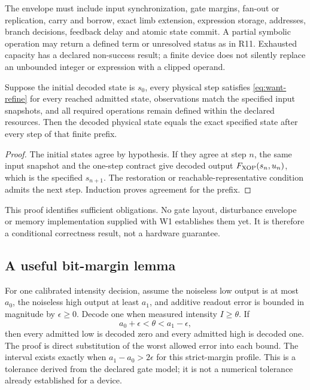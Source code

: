 The envelope must include input synchronization, gate margins, fan-out or
replication, carry and borrow, exact limb extension, expression storage,
addresses, branch decisions, feedback delay and atomic state commit. A partial
symbolic operation may return a defined term or unresolved status as in R11.
Exhausted capacity has a declared non-success result; a finite device does not
silently replace an unbounded integer or expression with a clipped operand.

\begin{proposition}
Suppose the initial decoded state is $s_0$, every physical step satisfies
\eqref{eq:want-refine} for every reached admitted state, observations match the
specified input snapshots, and all required operations remain defined within
the declared resources. Then the decoded physical state equals the exact
specified state after every step of that finite prefix.
\end{proposition}
\begin{proof}
The initial states agree by hypothesis. If they agree at step $n$, the same
input snapshot and the one-step contract give decoded output $F_{\rm XOP}(s_n,u_n)$,
which is the specified $s_{n+1}$. The restoration or reachable-representative
condition admits the next step. Induction proves agreement for the prefix.
\end{proof}
This proof identifies sufficient obligations. No gate layout, disturbance
envelope or memory implementation supplied with W1 establishes them yet.
It is therefore a conditional correctness result, not a hardware guarantee.

\subsection{A useful bit-margin lemma}
For one calibrated intensity decision, assume the noiseless low output is at
most $a_0$, the noiseless high output at least $a_1$, and additive readout error
is bounded in magnitude by $\epsilon\ge0$. Decode one when measured intensity
$I\ge\theta$. If
\begin{equation}
 a_0+\epsilon<\theta<a_1-\epsilon,
\end{equation}
then every admitted low is decoded zero and every admitted high is decoded one.
The proof is direct substitution of the worst allowed error into each bound.
The interval exists exactly when $a_1-a_0>2\epsilon$ for this strict-margin
profile. This is a tolerance derived from the declared gate model; it is not
a numerical tolerance already established for a device.

